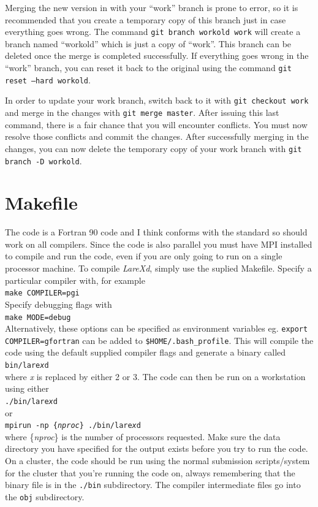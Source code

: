 \documentclass[11pt]{article}
\begin{document}
Merging the new version in with your ``work'' branch is prone to error, so it
is recommended that you create a temporary copy of this branch just in case
everything goes wrong. The command \texttt{git branch workold work} will
create a branch named ``workold'' which is just a copy of ``work''. This branch
can be deleted once the merge is completed successfully. If everything goes
wrong in the ``work'' branch, you can reset it back to the original using the
command \texttt{git reset --hard workold}.

In order to update your work branch, switch back to it with
\texttt{git checkout work} and merge in the changes with
\texttt{git merge master}.
After issuing this last command, there is a fair chance that you will encounter
conflicts. You must now resolve those conflicts and commit the changes.
After successfully merging in the changes, you can now delete the temporary
copy of your work branch with \texttt{git branch -D workold}.

\section{Makefile}

The code is a Fortran 90 code and I think conforms with the standard so should work on all compilers. Since the code is also parallel you must have MPI installed to compile and run the code, even if you are only going to run on a single processor machine.
To compile {\it LareXd}, simply use the suplied Makefile. Specify a particular compiler with, for example \\
\texttt{make COMPILER=pgi}\\
Specify debugging flags with\\ 
\texttt{make MODE=debug}\\
Alternatively, these options can be specified as environment variables
eg. \texttt{export COMPILER=gfortran} can be added to \texttt{\$HOME/.bash\_profile}.
This will compile the code using the default supplied compiler flags and generate a binary called\\
\texttt{bin/lare{\it x}d}\\
where {\it x} is replaced by either 2 or 3. The code can then be run on a workstation using either\\
\texttt{./bin/lare{\it x}d}\\
or\\
\texttt{mpirun -np \{{\it nproc}\} ./bin/lare{\it x}d}\\
where \{{\it nproc}\} is the number of processors requested. Make sure the data directory you have specified for the output exists
before you try to run the code. On a cluster, the
code should be run using the normal submission scripts/system for the cluster
that you're running the code on, always remembering that the binary file is in
the \texttt{./bin} subdirectory. The compiler intermediate files go into the
\texttt{obj} subdirectory. \\
\end{document}
